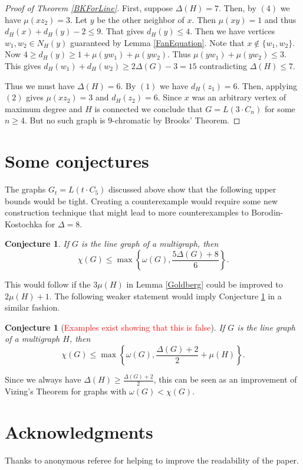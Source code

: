 \documentclass[12pt]{article}
\theoremstyle{plain}
\newtheorem{conjecture}[thm]{Conjecture}
\theoremstyle{definition}
\theoremstyle{remark}
\begin{document}
\begin{proof}[Proof of Theorem \ref{BKForLine}]
First, suppose $\Delta(H) = 7$.  Then, by $(4)$ we have $\mu(xz_2) = 3$.  Let $y$ be the other neighbor of $x$.  Then $\mu(xy) = 1$ and thus $d_H(x) + d_H(y) - 2 \leq 9$.  That gives $d_H(y) \leq 4$.  Then we have vertices $w_1, w_2 \in N_H(y)$ guaranteed by Lemma \ref{FanEquation}. Note that $x \not \in \{w_1, w_2\}$.  Now $4 \geq d_H(y) \geq 1 + \mu(yw_1) + \mu(yw_2)$.  Thus $\mu(yw_1) + \mu(yw_2) \leq 3$.  This gives $d_H(w_1) + d_H(w_2) \geq 2\Delta(G) - 3 = 15$ contradicting $\Delta(H) \leq 7$.

Thus we must have $\Delta(H) = 6$.  By $(1)$ we have $d_H(z_1) = 6$.  Then, applying $(2)$ gives $\mu(xz_2) = 3$ and $d_H(z_2) = 6$.  Since $x$ was an arbitrary vertex of maximum degree and $H$ is connected we conclude that $G = L(3\cdot C_n)$ for some $n \geq 4$.  But no such graph is $9$-chromatic by Brooks' Theorem.
\end{proof}

\section{Some conjectures}

The graphs $G_t = L(t \cdot C_5)$ discussed above show that the following upper bounds would be tight.  Creating a counterexample would require some new construction technique that might lead to more counterexamples to Borodin-Kostochka for $\Delta=8$.

\begin{conjecture}\label{BestPossibleWithJustDelta}
If $G$ is the line graph of a multigraph, then
\[\chi(G) \leq \max\left\{\omega(G),\frac{5\Delta(G) + 8}{6}\right\}.\]
\end{conjecture}

\noindent This would follow if the $3\mu(H)$ in Lemma \ref{Goldberg} could be improved to $2\mu(H) + 1$.  The following weaker statement would imply Conjecture \ref{BestPossibleWithJustDelta} in a similar fashion.

\begin{conjecture}[\textcolor{red}{Examples exist showing that this is false}]
If $G$ is the line graph of a multigraph $H$, then
\[\chi(G) \leq  \max\left\{\omega(G), \frac{\Delta(G) + 2}{2} + \mu(H)\right\}.\]
\end{conjecture}

\noindent Since we always have $\Delta(H) \geq \frac{\Delta(G) + 2}{2}$, this can be seen as an improvement of Vizing's Theorem for graphs with $\omega(G) < \chi(G)$.

\section*{Acknowledgments}
Thanks to anonymous referee for helping to improve the readability of the paper.



\end{document}

